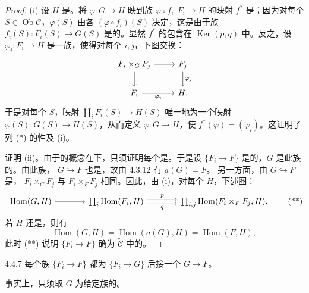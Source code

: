 \begin{proof}
(i) 设 $H$ 是。将 $\varphi:G\to H$ 映到族 $\varphi\circ f_i:F_i\to H$ 的映射 $f^*$ 是；因为对每个 $S\in\operatorname{Ob}\mathcal C$，$\varphi(S)$ 由各 $(\varphi\circ f_i)(S)$ 决定，这是由于族 $f_i(S):F_i(S)\to G(S)$ 是的。显然 $f^*$ 的包含在 $\operatorname{Ker}(p,q)$ 中。反之，设 $\varphi_i:F_i\to H$ 是一族，使得对每个 $i,j$，下图交换：
\[
\begin{tikzcd}
F_i\times_G F_j\arrow[r]\arrow[d]&F_j\arrow[d,"\varphi_j"]\\
F_i\arrow[r,"\varphi_i"']&H.
\end{tikzcd}
\]
于是对每个 $S$，映射 $\coprod_iF_i(S)\to H(S)$ 唯一地为一个映射 $\varphi(S):G(S)\to H(S)$，从而定义 $\varphi:G\to H$，使 $f^*(\varphi)=(\varphi_i)$。这证明了列 (*) 的性及 (i)。

证明 (ii)。由于的概念在下，只须证明每个是。于是设 $\{F_i\to F\}$ 是的，$G$ 是此族的。由此族， $G\hookrightarrow F$ 也是，故由 4.3.12 有 $a(G)=F$。
另一方面，由 $G\hookrightarrow F$ 是， $F_i\times_G F_j$ 与 $F_i\times_F F_j$ 相同。因此，由 (i)，对每个 $H$，下述图：
\[
\begin{tikzcd}[column sep=large]
\operatorname{Hom}(G,H)\arrow[r]&\prod_i\operatorname{Hom}(F_i,H)\arrow[r,shift left=.6ex,"p"]\arrow[r,shift right=.6ex,"q"']&\prod_{i,j}\operatorname{Hom}(F_i\times_F F_j,H).
\end{tikzcd}\tag{**}
\]
若 $H$ 还是，则有
\[
\operatorname{Hom}(G,H)=\operatorname{Hom}(a(G),H)=\operatorname{Hom}(F,H),
\]
此时 (**) 说明 $\{F_i\to F\}$ 确为 $\widetilde{\mathcal C}$ 中的。
\end{proof}
\begin{SGAresult}{}{4.4.7}
每个族 $\{F_i\to F\}$ 都为 $\{F_i\to G\}$ 后接一个 $G\to F$。
\end{SGAresult}
事实上，只须取 $G$ 为给定族的。


